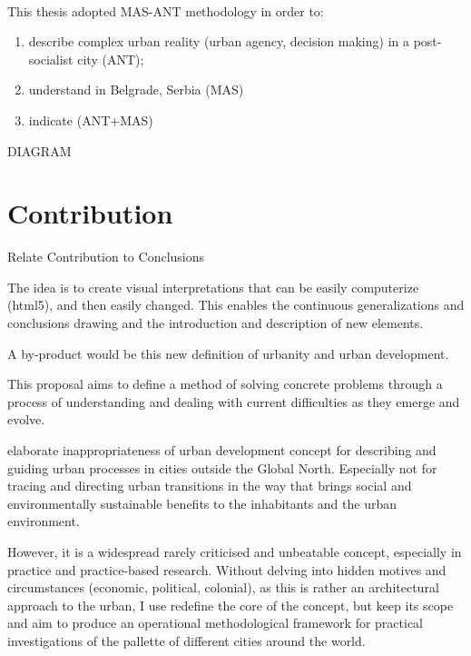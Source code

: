\documentclass[11pt]{report}
\begin{document}
\\
This thesis adopted MAS-ANT methodology in order to:
\begin{enumerate}
\item describe complex urban reality  (urban agency, decision making)  in a post-socialist city (ANT);
\item understand   in Belgrade, Serbia (MAS)
\item indicate   (ANT+MAS) 
\end{enumerate}
DIAGRAM

\section{Contribution}

Relate Contribution to Conclusions

The idea is to create visual interpretations that can be easily computerize (html5), and then easily changed. This enables the continuous generalizations and conclusions drawing and the introduction and description of new elements.

A by-product would be this new definition of urbanity and urban development.

This proposal aims to define a method of solving concrete problems through a process of understanding and dealing with current difficulties as they emerge and evolve.

elaborate inappropriateness of urban development concept for describing and guiding urban processes in cities outside the Global North. Especially not for tracing and directing urban transitions in the way that brings social and environmentally sustainable benefits to the inhabitants and the urban environment.

However, it is a widespread rarely criticised and unbeatable concept, especially in practice and practice-based research. Without delving into hidden motives and circumstances (economic, political, colonial), as this is rather an architectural approach to the urban, I use redefine the core of the concept, but keep its scope and aim to produce an operational methodological framework for practical investigations of the pallette of different cities around the world.
\end{document}
